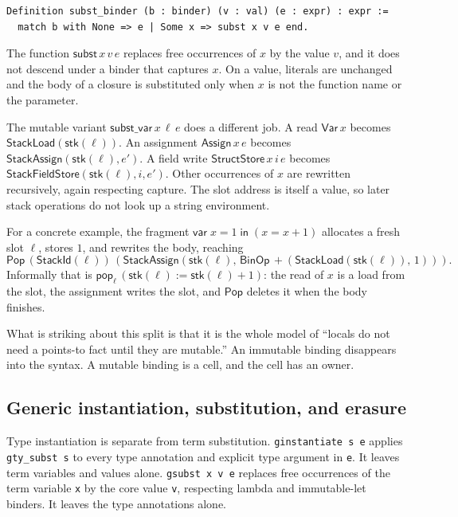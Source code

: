 \documentclass[11pt]{article}
\begin{document}
\begin{lstlisting}
Definition subst_binder (b : binder) (v : val) (e : expr) : expr :=
  match b with None => e | Some x => subst x v e end.
\end{lstlisting}

The function \(\mathsf{subst}\,x\,v\,e\) replaces free occurrences of \(x\) by the value \(v\), and it does not descend under a binder that captures \(x\).
On a value, literals are unchanged and the body of a closure is substituted only when \(x\) is not the function name or the parameter.

The mutable variant \(\mathsf{subst\_var}\,x\,\ell\,e\) does a different job.
A read \(\mathsf{Var}\,x\) becomes \(\mathsf{StackLoad}(\mathsf{stk}(\ell))\).
An assignment \(\mathsf{Assign}\,x\,e\) becomes \(\mathsf{StackAssign}(\mathsf{stk}(\ell), e')\).
A field write \(\mathsf{StructStore}\,x\,i\,e\) becomes \(\mathsf{StackFieldStore}(\mathsf{stk}(\ell), i, e')\).
Other occurrences of \(x\) are rewritten recursively, again respecting capture.
The slot address is itself a value, so later stack operations do not look up a string environment.

For a concrete example, the fragment \(\mathsf{var}\;x = 1\;\mathsf{in}\;(x = x + 1)\)
allocates a fresh slot \(\ell\), stores \(1\), and rewrites the body, reaching
\[
\mathsf{Pop}\,(\mathsf{StackId}(\ell))\,
  (\mathsf{StackAssign}(\mathsf{stk}(\ell),\,
    \mathsf{BinOp}\,{+}(\mathsf{StackLoad}(\mathsf{stk}(\ell)),\,1))).
\]
Informally that is \(\mathsf{pop}_{\ell}\,(\mathsf{stk}(\ell) := \mathsf{stk}(\ell) + 1)\):
the read of \(x\) is a load from the slot, the assignment writes the slot, and \(\mathsf{Pop}\) deletes it when the body finishes.

What is striking about this split is that it is the whole model of ``locals do not need a points-to fact until they are mutable.''
An immutable binding disappears into the syntax.
A mutable binding is a cell, and the cell has an owner.

\subsection{Generic instantiation, substitution, and erasure}
\label{sec:generic-erasure}

Type instantiation is separate from term substitution.
\texttt{ginstantiate s e} applies \texttt{gty\_subst s} to every type
annotation and explicit type argument in \texttt{e}. It leaves term
variables and values alone. \texttt{gsubst x v e} replaces free occurrences
of the term variable \texttt{x} by the core value \texttt{v}, respecting
lambda and immutable-let binders. It leaves the type annotations alone.
\end{document}
